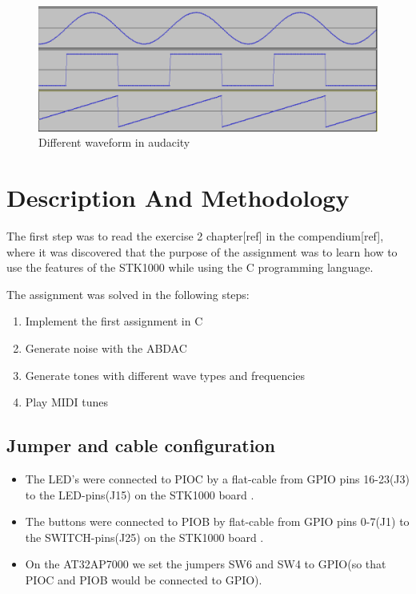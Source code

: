 \documentclass[a4paper,12pt]{article}
\begin{document}
\begin{figure}[b]
        \centering
            \includegraphics[width=\textwidth]{waveforms}
            \caption{Different waveform in audacity}
            \label{waveforms}
\end{figure}



\clearpage
\section{Description And Methodology}

The first step was to read the exercise 2 chapter[ref] in the compendium[ref], where it was discovered that the purpose of the assignment was to learn how to use the features of the STK1000 while using the C programming language.

The assignment was solved in the following steps:
\begin{enumerate}
\item Implement the first assignment in C
\item Generate noise with the ABDAC
\item Generate tones with different wave types and frequencies
\item Play MIDI tunes
\end{enumerate} 

\subsection{Jumper and cable configuration}
\begin{itemize}
\item The LED’s were connected to PIOC by a flat-cable from GPIO pins 16-23(J3) to the LED-pins(J15) on the STK1000 board \cite[section~2.4.1]{compendium}.
\item The buttons were connected to PIOB by flat-cable from GPIO pins 0-7(J1) to the SWITCH-pins(J25) on the STK1000 board \cite[section~2.4.1]{compendium}.
\item On the AT32AP7000 we set the jumpers SW6 and SW4 to GPIO(so that PIOC and PIOB would be connected to GPIO)\cite[table~2.3]{compendium}.
\end{itemize}
\end{document}
